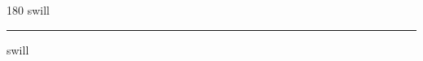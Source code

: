 
\begin{frame}
\begin{center}
\begin{turn}{180}
{\fontsize{2.5cm}{1em}\selectfont swill}
\end{turn}
\vspace{1em}\par  
\hrule
\vspace{1em}\par  
{\fontsize{2.5cm}{1em}\selectfont swill}
\end{center}
\end{frame}
